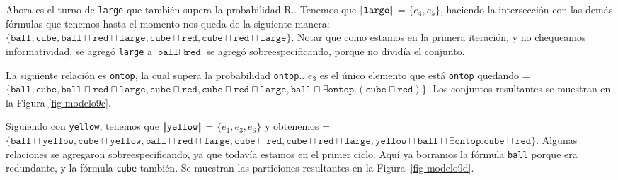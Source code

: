 Ahora es el turno de \texttt{large} que tambi\'en supera la probabilidad R.\randomuse. Tenemos que $|\!|\texttt{large}|\!|$ = $\{e_4, e_5\}$, haciendo la intersecci\'on con las dem\'as f\'ormulas que tenemos hasta el momento nos queda \RE de la siguiente manera:
 $\{\texttt{ball}, \texttt{cube}, \texttt{ball} \sqcap \texttt{red} \sqcap \texttt{large}, \texttt{cube} \sqcap \texttt{red} ,\texttt{cube} \sqcap \texttt{red} \sqcap \texttt{large} \}$. Notar que como estamos en la primera iteraci\'on, y no chequeamos informatividad, se agreg\'o \texttt{large} a $\texttt{ball} \sqcap \texttt{red}$ se agreg\'o sobreespecificando, porque no divid\'ia el conjunto. 

La siguiente relaci\'on es \texttt{ontop}, la cual supera la probabilidad \texttt{ontop}.\randomuse. $e_3$ es el \'unico elemento que est\'a \texttt{ontop} quedando \RE= $\{\texttt{ball}, \texttt{cube}, \texttt{ball} \sqcap \texttt{red} \sqcap \texttt{large}, \texttt{cube} \sqcap \texttt{red}, \texttt{cube} \sqcap \texttt{red} \sqcap \texttt{large}, \texttt{ball} \sqcap \exists \texttt{ontop}.(\texttt{cube} \sqcap \texttt{red})\}$. Los conjuntos resultantes se muestran en la Figura \ref{fig-modelo9c}.


Siguiendo con \texttt{yellow}, tenemos que $|\!|\texttt{yellow}|\!|$ = $\{e_1, e_3, e_6\}$ y obtenemos \RE= $\{\texttt{ball} \sqcap \texttt{yellow}, \texttt{cube} \sqcap \texttt{yellow}, \texttt{ball} \sqcap \texttt{red} \sqcap \texttt{large}, \texttt{cube} \sqcap \texttt{red}, \texttt{cube} \sqcap \texttt{red} \sqcap \texttt{large}, \texttt{yellow} \sqcap \texttt{ball} \sqcap \exists \texttt{ontop}.\texttt{cube} \sqcap \texttt{red} \}$. Algunas relaciones se agregaron sobreespecificando, ya que todav\'ia estamos en el primer ciclo.
Aqu\'i ya borramos la f\'ormula \texttt{ball} porque era redundante, y la f\'ormula \texttt{cube} tambi\'en. Se muestran las particiones resultantes en la Figura~\ref{fig-modelo9d}.

